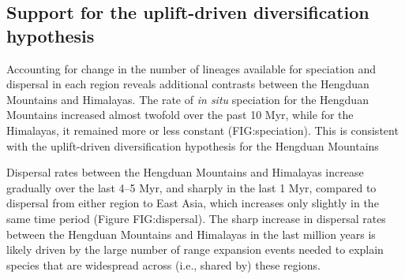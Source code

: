 \subsection{Support for the uplift-driven diversification hypothesis}

Accounting for change in the number of lineages available for speciation and dispersal in each region reveals additional contrasts between the Hengduan Mountains and Himalayas. The rate of \textit{in situ} speciation for the Hengduan Mountains increased almost twofold over the past 10 Myr, while for the Himalayas, it remained more or less constant (FIG:speciation). This is consistent with the uplift-driven diversification hypothesis for the Hengduan Mountains

Dispersal rates between the Hengduan Mountains and Himalayas increase gradually over the last 4--5 Myr, and sharply in the last 1 Myr, compared to dispersal from either region to East Asia, which increases only slightly in the same time period (Figure FIG:dispersal). The sharp increase in dispersal rates between the Hengduan Mountains and Himalayas in the last million years is likely driven by the large number of range expansion events needed to explain species that are widespread across (i.e., shared by) these regions.
